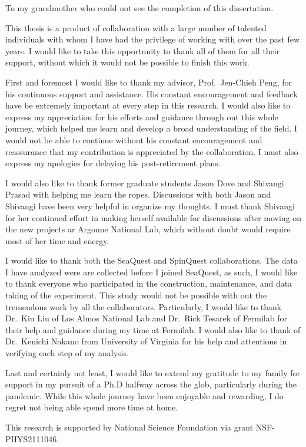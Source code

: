 \documentclass[../main.tex]{subfiles}
\begin{document}
\begin{dedication}
	To my grandmother who could not see the completion of this dissertation.
\end{dedication}

\begin{acknowledgments}
	This thesis is a product of collaboration with a large number of talented
	individuals with whom I have had the privilege of working with over the past
	few years. I would like to take this opportunity to thank all of them for all
	their support, without which it would not be possible to finish this work.

	First and foremost I would like to thank my advisor, Prof.~Jen-Chieh Peng, for
	his continuous support and assistance. His constant encouragement and feedback
	have be extremely important at every step in this research.
	I would also like to express my	appreciation for his efforts and guidance
	through out this whole journey, which helped me learn and develop a broad
	understanding of the field. 
	I would not be able to continue without his constant encouragement and reassurance
	that my contribution is appreciated by the collaboration.
	I must also express my apologies for delaying his post-retirement plans.

	I would also like to thank former graduate students Jason Dove and Shivangi
	Prasad with helping me learn the ropes. Discussions with both Jason and
	Shivangi have been very helpful in organize my thoughts.
	I must thank Shivangi for her continued effort in making herself available for 
	discussions after moving on the new projects ar Argonne National Lab, which
	without doubt would require most of her time and energy.

	I would like to thank both the SeaQuest and SpinQuest collaborations.
	The data I have analyzed were are collected before I joined SeaQuest, as such,
	I would like to thank everyone who participated in the construction, maintenance,
	and data taking of the experiment.
	This study would not be possible with out the tremendous work by all the
	collaborators. 
	Particularly, I would like to thank Dr.~Kiu Liu of Los Almos
	National Lab and Dr.~Rick Tesarek of Fermilab for their help and guidance during
	my time at Fermilab. I would also like to thank of Dr.~Kenichi Nakano from University of Virginia
	for his help and attentions in verifying each step of my analysis.

	Last and certainly not least, I would like to extend my gratitude to my family
	for support in my pursuit of a Ph.D halfway across the glob, particularly
	during the pandemic. While this whole journey have been enjoyable and rewarding, 
	I do regret not being able spend more time at home. 

	This research is supported by National Science Foundation via grant NSF-PHYS2111046.

\end{acknowledgments}
\end{document}
